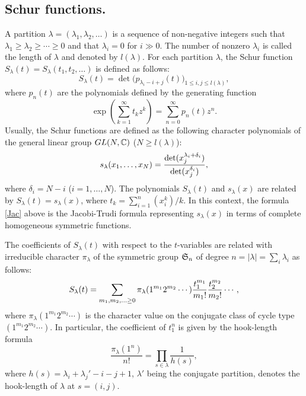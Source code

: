 \subsection{Schur functions.}\quad
%
A partition $\lambda=(\lambda_1,\lambda_2,\ldots)$ is a 
sequence of non-negative integers such that 
$\lambda_1 \geq \lambda_2 \geq \cdots \geq 0$
and that $\lambda_i=0$ for $i\gg 0$. 
The number of nonzero $\lambda_i$ is called the length of $\lambda$
and denoted by $l(\lambda)$.
For each partition $\lambda$, the Schur function $S_\lambda(t)=
S_{\lambda}(t_1,t_2,\ldots)$ is defined as follows: 
\begin{equation}
\label{Jac}
S_{\lambda}(t)=
\det \big( p_{\lambda_i-i+j}(t) \big)_{1 \leq i,j \leq l(\lambda)},
\end{equation}
where $p_n(t)$ are the polynomials defined by the generating 
function
\begin{equation}
\exp \left(\sum_{k=1}^{\infty} t_k z^k \right)=
\sum_{n=0}^{\infty}p_n(t)z^n. 
\end{equation}
Usually, the Schur functions are defined as the following 
character polynomials of the general linear group $GL(N,{\Bbb C})$ 
($N \geq l(\lambda)$): 
\begin{equation}
s_{\lambda}(x_1,\ldots,x_N)={
\det(x_j^{\lambda_i+\delta_i}) \over
\det(x_j^{\delta_i})},
\end{equation}
where $\delta_i=N-i$ ($i=1,\ldots,N$).
The polynomials 
$S_{\lambda}(t)$ and $s_{\lambda}(x)$ are related by 
$S_{\lambda}(t)=s_{\lambda}(x)$, where $t_k=\sum_{i=1}^n (x_i^k)/k$.
In this context, the formula \eqref{Jac} above is the Jacobi-Trudi 
formula representing $s_\lambda(x)$ in terms of complete 
homogeneous symmetric functions. 

The coefficients of $S_{\lambda}(t)$ with respect to the $t$-variables
are related with irreducible character $\pi_{\lambda}$ of 
the symmetric group ${\frak S}_n$ of degree 
$n=\vert \lambda \vert=\sum_{i} \lambda_i$ as follows:
\begin{equation}
S_{\lambda}(t)=\sum_{m_1,m_2,\ldots \geq 0}
\pi_{\lambda}(1^{m_1}2^{m_2}\cdots)
{t_1^{m_1} \over m_1 !}
{t_2^{m_2} \over m_2 !} \cdots,
\end{equation}
where $\pi_{\lambda}(1^{m_1}2^{m_2}\cdots)$ is the character value
on the conjugate class of cycle type $(1^{m_1}2^{m_2}\cdots)$.
In particular, the coefficient of $t_1^n$ is given by the 
hook-length formula
\begin{equation}
\frac{\pi_\lambda(1^n)}{n!} = \prod_{s\in\lambda} \frac{1}{h(s)},
\end{equation}
where $h(s)=\lambda_i+\lambda_j'-i-j+1$, $\lambda'$ being 
the conjugate partition, denotes the hook-length of $\lambda$
at $s=(i,j)$.
%
